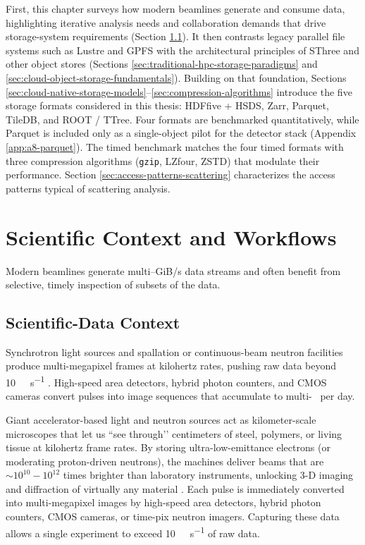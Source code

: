 \documentclass[nomenclature, english, bibtex]{kththesis}
\numberwithin{listing}{chapter}
\begin{document}
First, this chapter surveys how modern beamlines generate and consume data, highlighting iterative analysis needs and collaboration demands that drive storage-system requirements (Section \ref{sec:scientific-data-context}). It then contrasts legacy parallel file systems such as Lustre and \gls{GPFS} with the architectural principles of \gls{SThree} and other object stores (Sections \ref{sec:traditional-hpc-storage-paradigms} and \ref{sec:cloud-object-storage-fundamentals}). Building on that foundation, Sections \ref{sec:cloud-native-storage-models}–\ref{sec:compression-algorithms} introduce the five storage formats considered in this thesis: \gls{HDFfive} + \gls{HSDS}, Zarr, Parquet, TileDB, and \gls{ROOT} / \gls{TTree}. Four formats are benchmarked quantitatively, while Parquet is included only as a single-object pilot for the detector stack (Appendix \ref{app:a8-parquet}). The timed benchmark matches the four timed formats with three compression algorithms (\texttt{gzip}, \gls{LZfour}, \gls{ZSTD}) that modulate their performance. Section \ref{sec:access-patterns-scattering} characterizes the access patterns typical of scattering analysis.





\section{Scientific Context and Workflows}
\label{sec:scientific-context-workflows}
Modern beamlines generate multi–GiB/s data streams and often benefit from selective, timely inspection of subsets of the data.

\subsection{Scientific-Data Context}
\label{sec:scientific-data-context}
Synchrotron light sources and spallation or continuous-beam neutron facilities produce multi-megapixel frames at kilohertz rates, pushing raw data beyond \SI{10}{\giga\byte\per\second} \cite{eriksson2014diffraction}. High-speed area detectors, hybrid photon counters, and \gls{CMOS} cameras convert pulses into image sequences that accumulate to multi-\si{\tera\byte} per day.

Giant accelerator-based light and neutron sources act as kilometer-scale microscopes that let us “see through’’ centimeters of steel, polymers, or living tissue at kilohertz frame rates. By storing ultra-low-emittance electrons (or moderating proton-driven neutrons), the machines deliver beams that are \(\sim10^{10}\!-\!10^{12}\) times brighter than laboratory instruments, unlocking 3-D imaging and diffraction of virtually any material \cite{eriksson2014diffraction}. Each pulse is immediately converted into multi-megapixel images by high-speed area detectors, hybrid photon counters, \gls{CMOS} cameras, or time-pix neutron imagers. Capturing these data allows a single experiment to exceed \SI{10}{\giga\byte\per\second} of raw data.
\end{document}
